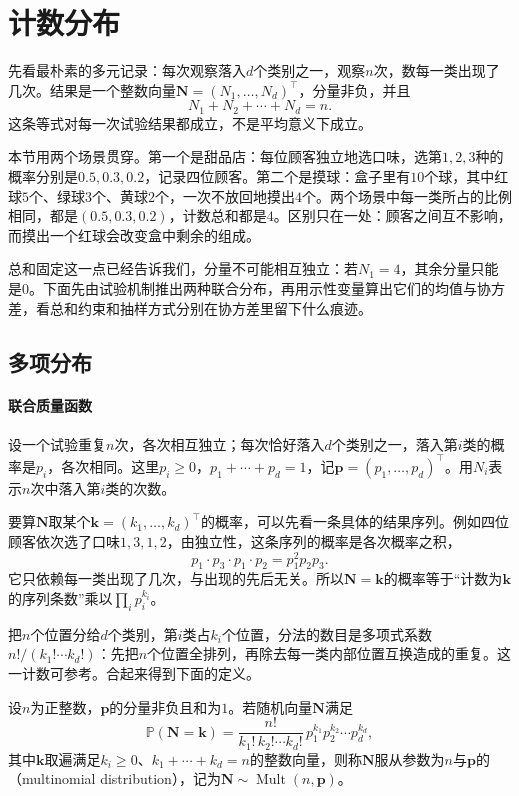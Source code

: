 \section{计数分布}
\label{sec:mvd-counting}

先看最朴素的多元记录：每次观察落入$d$个类别之一，观察$n$次，数每一类出现了几次。结果是一个整数向量$\bm{N}=(N_1,\ldots,N_d)^{\top}$，分量非负，并且
\[
 N_1+N_2+\cdots+N_d=n .
\]
这条等式对每一次试验结果都成立，不是平均意义下成立。

本节用两个场景贯穿。第一个是甜品店：每位顾客独立地选口味，选第$1,2,3$种的概率分别是$0.5,0.3,0.2$，记录四位顾客。第二个是摸球：盒子里有$10$个球，其中红球$5$个、绿球$3$个、黄球$2$个，一次不放回地摸出$4$个。两个场景中每一类所占的比例相同，都是$(0.5,0.3,0.2)$，计数总和都是$4$。区别只在一处：顾客之间互不影响，而摸出一个红球会改变盒中剩余的组成。

总和固定这一点已经告诉我们，分量不可能相互独立：若$N_1=4$，其余分量只能是$0$。下面先由试验机制推出两种联合分布，再用示性变量算出它们的均值与协方差，看总和约束和抽样方式分别在协方差里留下什么痕迹。

\subsection{多项分布}
\label{sec:mvd-multinomial}

\paragraph{联合质量函数}
设一个试验重复$n$次，各次相互独立；每次恰好落入$d$个类别之一，落入第$i$类的概率是$p_i$，各次相同。这里$p_i\geq0$，$p_1+\cdots+p_d=1$，记$\bm{p}=(p_1,\ldots,p_d)^{\top}$。用$N_i$表示$n$次中落入第$i$类的次数。

要算$\bm{N}$取某个$\bm{k}=(k_1,\ldots,k_d)^{\top}$的概率，可以先看一条具体的结果序列。例如四位顾客依次选了口味$1,3,1,2$，由独立性，这条序列的概率是各次概率之积，
\[
 p_1\cdot p_3\cdot p_1\cdot p_2=p_1^{2}p_2p_3 .
\]
它只依赖每一类出现了几次，与出现的先后无关。所以$\bm{N}=\bm{k}$的概率等于“计数为$\bm{k}$的序列条数”乘以$\prod_ip_i^{k_i}$。

把$n$个位置分给$d$个类别，第$i$类占$k_i$个位置，分法的数目是多项式系数$n!/(k_1!\cdots k_d!)$：先把$n$个位置全排列，再除去每一类内部位置互换造成的重复。这一计数可参考。合起来得到下面的定义。

\begin{definition}[多项分布]
\label{def:mvd-multinomial}
设$n$为正整数，$\bm{p}$的分量非负且和为$1$。若随机向量$\bm{N}$满足
\begin{equation}
 \mathbb{P}(\bm{N}=\bm{k})=\frac{n!}{k_1!\,k_2!\cdots k_d!}\,p_1^{k_1}p_2^{k_2}\cdots p_d^{k_d},
 \label{eq:mvd-multinomial-pmf}
\end{equation}
其中$\bm{k}$取遍满足$k_i\geq0$、$k_1+\cdots+k_d=n$的整数向量，则称$\bm{N}$服从参数为$n$与$\bm{p}$的（multinomial distribution），记为$\bm{N}\sim\operatorname{Mult}(n,\bm{p})$。
\end{definition}

